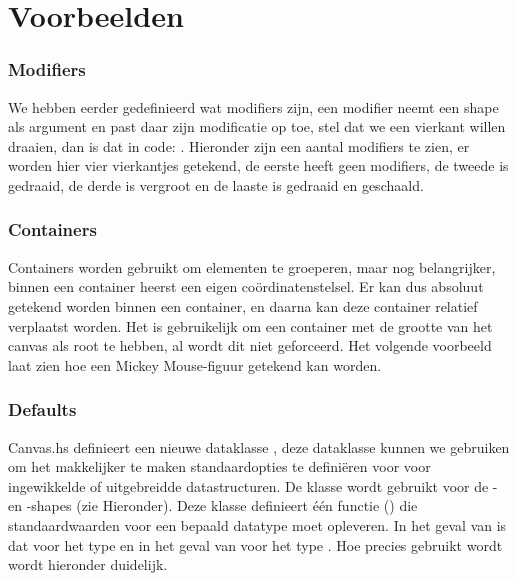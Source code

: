 \section{Voorbeelden}
\subsubsection{Modifiers}
We hebben eerder gedefinieerd wat modifiers zijn, een modifier neemt een shape als argument en past daar zijn modificatie op toe, stel dat we een vierkant willen draaien, dan is dat in code: . Hieronder zijn een aantal modifiers te zien, er worden hier vier vierkantjes getekend, de eerste heeft geen modifiers, de tweede is gedraaid, de derde is vergroot en de laaste is gedraaid en geschaald.



\subsubsection{Containers}
Containers worden gebruikt om elementen te groeperen, maar nog belangrijker, binnen een container heerst een eigen coördinatenstelsel. Er kan dus absoluut getekend worden binnen een container, en daarna kan deze container relatief verplaatst worden. Het is gebruikelijk om een container met de grootte van het canvas als root te hebben, al wordt dit niet geforceerd. Het volgende voorbeeld laat zien hoe een Mickey Mouse-figuur getekend kan worden.



\subsubsection{Defaults} \label{subsubsec:handleiding_defaults}
Canvas.hs definieert een nieuwe dataklasse , deze dataklasse kunnen we gebruiken om het makkelijker te maken standaardopties te definiëren voor voor ingewikkelde of uitgebreidde datastructuren. De klasse wordt gebruikt voor de - en -shapes (zie Hieronder). Deze klasse definieert één functie () die standaardwaarden voor een bepaald datatype moet opleveren. In het geval van  is dat voor het type  en in het geval van  voor het type . Hoe  precies gebruikt wordt wordt hieronder duidelijk.

